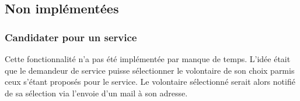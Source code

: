 \subsection{Non implémentées}

\subsubsection{Candidater pour un service}
Cette fonctionnalité n'a pas été implémentée par manque de temps. L'idée était que le demandeur de service puisse sélectionner le volontaire de son choix parmis ceux s'étant proposés pour le service. Le volontaire sélectionné serait alors notifié de sa sélection via l'envoie d'un mail à son adresse.
